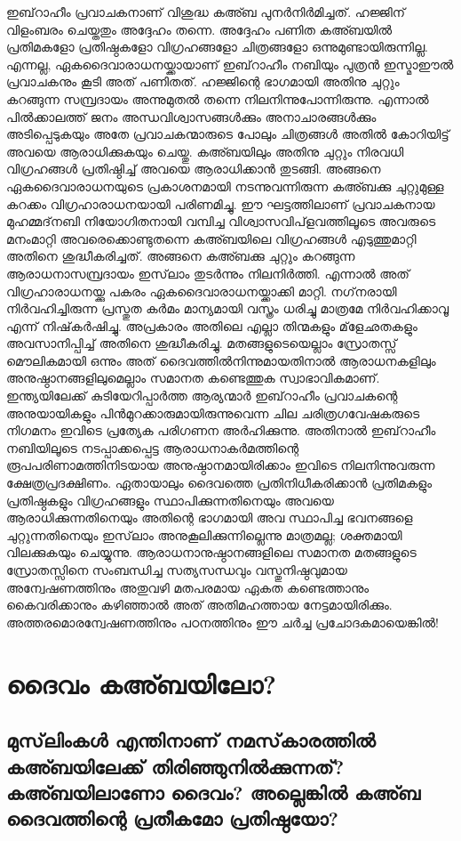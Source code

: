  ഇബ്‌റാഹീം പ്രവാചകനാണ് വിശുദ്ധ കഅ്ബ പുനര്‍നിര്‍മിച്ചത്. ഹജ്ജിന് വിളംബരം ചെയ്തതും അദ്ദേഹം തന്നെ. അദ്ദേഹം പണിത കഅ്ബയില്‍ പ്രതിമകളോ പ്രതിഷ്ഠകളോ വിഗ്രഹങ്ങളോ ചിത്രങ്ങളോ ഒന്നുമുണ്ടായിരുന്നില്ല. എന്നല്ല, ഏകദൈവാരാധനയ്ക്കായാണ് ഇബ്‌റാഹീം നബിയും പുത്രന്‍ ഇസ്മാഈല്‍ പ്രവാചകനും കൂടി അത് പണിതത്. ഹജ്ജിന്റെ ഭാഗമായി അതിനു ചുറ്റും കറങ്ങുന്ന സമ്പ്രദായം അന്നുമുതല്‍ തന്നെ നിലനിന്നുപോന്നിരുന്നു. എന്നാല്‍ പില്‍ക്കാലത്ത് ജനം അന്ധവിശ്വാസങ്ങള്‍ക്കും അനാചാരങ്ങള്‍ക്കും അടിപ്പെടുകയും അതേ പ്രവാചകന്മാരുടെ പോലും ചിത്രങ്ങള്‍ അതില്‍ കോറിയിട്ട് അവയെ ആരാധിക്കുകയും ചെയ്തു. കഅ്ബയിലും അതിനു ചുറ്റും നിരവധി വിഗ്രഹങ്ങള്‍ പ്രതിഷ്ഠിച്ച് അവയെ ആരാധിക്കാന്‍ തുടങ്ങി. അങ്ങനെ ഏകദൈവാരാധനയുടെ പ്രകാശനമായി നടന്നുവന്നിരുന്ന കഅ്ബക്കു ചുറ്റുമുള്ള കറക്കം വിഗ്രഹാരാധനയായി പരിണമിച്ചു. ഈ ഘട്ടത്തിലാണ് പ്രവാചകനായ മുഹമ്മദ്‌നബി നിയോഗിതനായി വമ്പിച്ച വിശ്വാസവിപ്‌ളവത്തിലൂടെ അവരുടെ മനംമാറ്റി അവരെക്കൊണ്ടുതന്നെ കഅ്ബയിലെ വിഗ്രഹങ്ങള്‍ എടുത്തുമാറ്റി അതിനെ ശുദ്ധീകരിച്ചത്. അങ്ങനെ കഅ്ബക്കു ചുറ്റും കറങ്ങുന്ന ആരാധനാസമ്പ്രദായം ഇസ്‌ലാം തുടര്‍ന്നും നിലനിര്‍ത്തി. എന്നാല്‍ അത് വിഗ്രഹാരാധനയ്ക്കു പകരം ഏകദൈവാരാധനയ്ക്കാക്കി മാറ്റി. നഗ്‌നരായി നിര്‍വഹിച്ചിരുന്ന പ്രസ്തുത കര്‍മം മാന്യമായി വസ്ത്രം ധരിച്ചു മാത്രമേ നിര്‍വഹിക്കാവൂ എന്ന് നിഷ്‌കര്‍ഷിച്ചു. അപ്രകാരം അതിലെ എല്ലാ തിന്മകളും മ്‌ളേഛതകളും അവസാനിപ്പിച്ച് അതിനെ ശുദ്ധീകരിച്ചു.
മതങ്ങളുടെയെല്ലാം സ്രോതസ്സ് മൌലികമായി ഒന്നും അത് ദൈവത്തില്‍നിന്നുമായതിനാല്‍ ആരാധനകളിലും അനുഷ്ഠാനങ്ങളിലുമെല്ലാം സമാനത കണ്ടെത്തുക സ്വാഭാവികമാണ്. ഇന്ത്യയിലേക്ക് കുടിയേറിപ്പാര്‍ത്ത ആര്യന്മാര്‍ ഇബ്‌റാഹീം പ്രവാചകന്റെ അനുയായികളും പിന്‍മുറക്കാരുമായിരുന്നുവെന്ന ചില ചരിത്രഗവേഷകരുടെ നിഗമനം ഇവിടെ പ്രത്യേക പരിഗണന അര്‍ഹിക്കുന്നു. അതിനാല്‍ ഇബ്‌റാഹീം നബിയിലൂടെ നടപ്പാക്കപ്പെട്ട ആരാധനാകര്‍മത്തിന്റെ രൂപപരിണാമത്തിനിടയായ അനുഷ്ഠാനമായിരിക്കാം ഇവിടെ നിലനിന്നുവരുന്ന ക്ഷേത്രപ്രദക്ഷിണം. ഏതായാലും ദൈവത്തെ പ്രതിനിധീകരിക്കാന്‍ പ്രതിമകളും പ്രതിഷ്ഠകളും വിഗ്രഹങ്ങളും സ്ഥാപിക്കുന്നതിനെയും അവയെ ആരാധിക്കുന്നതിനെയും അതിന്റെ ഭാഗമായി അവ സ്ഥാപിച്ച ഭവനങ്ങളെ ചുറ്റുന്നതിനെയും ഇസ്‌ലാം അനുകൂലിക്കുന്നില്ലെന്നു മാത്രമല്ല; ശക്തമായി വിലക്കുകയും ചെയ്യുന്നു.
ആരാധനാനുഷ്ഠാനങ്ങളിലെ സമാനത മതങ്ങളുടെ സ്രോതസ്സിനെ സംബന്ധിച്ച സത്യസന്ധവും വസ്തുനിഷ്ഠവുമായ അന്വേഷണത്തിനും അതുവഴി മതപരമായ ഏകത കണ്ടെത്താനും കൈവരിക്കാനും കഴിഞ്ഞാല്‍ അത് അതിമഹത്തായ നേട്ടമായിരിക്കും. അത്തരമൊരന്വേഷണത്തിനും പഠനത്തിനും ഈ ചര്‍ച്ച പ്രചോദകമായെങ്കില്‍!
\chapter{ദൈവം കഅ്ബയിലോ? }
 \section{ മുസ്‌ലിംകള്‍ എന്തിനാണ് നമസ്‌കാരത്തില്‍ കഅ്ബയിലേക്ക് തിരിഞ്ഞുനില്‍ക്കുന്നത്? കഅ്ബയിലാണോ ദൈവം? അല്ലെങ്കില്‍ കഅ്ബ ദൈവത്തിന്റെ പ്രതീകമോ പ്രതിഷ്ഠയോ?}


